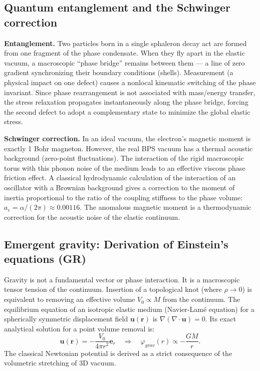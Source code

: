 \documentclass[11pt,a4paper]{article}
\begin{document}
\subsection{Quantum entanglement and the Schwinger correction}
\textbf{Entanglement.} Two particles born in a single sphaleron decay act are formed from one fragment of the phase condensate. When they fly apart in the elastic vacuum, a macroscopic ``phase bridge'' remains between them — a line of zero gradient synchronizing their boundary conditions (shells). Measurement (a physical impact on one defect) causes a nonlocal kinematic switching of the phase invariant. Since phase rearrangement is not associated with mass/energy transfer, the stress relaxation propagates instantaneously along the phase bridge, forcing the second defect to adopt a complementary state to minimize the global elastic stress.

\textbf{Schwinger correction.} In an ideal vacuum, the electron's magnetic moment is exactly 1 Bohr magneton. However, the real BPS vacuum has a thermal acoustic background (zero-point fluctuations). The interaction of the rigid macroscopic torus with this phonon noise of the medium leads to an effective viscous phase friction effect. A classical hydrodynamic calculation of the interaction of an oscillator with a Brownian background gives a correction to the moment of inertia proportional to the ratio of the coupling stiffness to the phase volume: $a_e = \alpha / (2\pi) \approx 0.00116$. The anomalous magnetic moment is a thermodynamic correction for the acoustic noise of the elastic continuum.

\subsection{Emergent gravity: Derivation of Einstein's equations (GR)}
Gravity is not a fundamental vector or phase interaction. It is a macroscopic tensor tension of the continuum. Insertion of a topological knot (where $\rho \to 0$) is equivalent to removing an effective volume $V_0 \propto M$ from the continuum. 
The equilibrium equation of an isotropic elastic medium (Navier-Lamé equation) for a spherically symmetric displacement field $\mathbf{u}(\mathbf{r})$ is $\nabla(\nabla \cdot \mathbf{u}) = 0$. Its exact analytical solution for a point volume removal is:
\begin{equation}
\mathbf{u}(\mathbf{r}) = -\frac{V_0}{4\pi r^2}\mathbf{e}_r \quad \Longrightarrow \quad \varphi_{grav}(r) \propto -\frac{GM}{r}.
\end{equation}
The classical Newtonian potential is derived as a strict consequence of the volumetric stretching of 3D vacuum.
\end{document}
